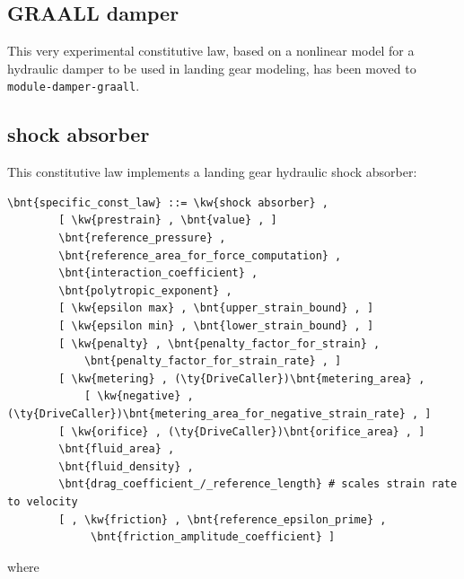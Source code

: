 \subsection{GRAALL damper}
This very experimental constitutive law, based on a nonlinear model
for a hydraulic damper to be used in landing gear modeling,
has been moved to \texttt{module-damper-graall}.

\subsection{shock absorber}\label{sec:CL:SHOCK-ABSORBER}
This constitutive law implements a landing gear hydraulic shock absorber:
\begin{Verbatim}[commandchars=\\\{\}]
    \bnt{specific_const_law} ::= \kw{shock absorber} ,
        [ \kw{prestrain} , \bnt{value} , ]
        \bnt{reference_pressure} ,
        \bnt{reference_area_for_force_computation} ,
        \bnt{interaction_coefficient} ,
        \bnt{polytropic_exponent} ,
        [ \kw{epsilon max} , \bnt{upper_strain_bound} , ]
        [ \kw{epsilon min} , \bnt{lower_strain_bound} , ]
        [ \kw{penalty} , \bnt{penalty_factor_for_strain} , 
            \bnt{penalty_factor_for_strain_rate} , ]
        [ \kw{metering} , (\ty{DriveCaller})\bnt{metering_area} ,
            [ \kw{negative} , (\ty{DriveCaller})\bnt{metering_area_for_negative_strain_rate} , ]
        [ \kw{orifice} , (\ty{DriveCaller})\bnt{orifice_area} , ]
        \bnt{fluid_area} ,
        \bnt{fluid_density} ,
        \bnt{drag_coefficient_/_reference_length} # scales strain rate to velocity
        [ , \kw{friction} , \bnt{reference_epsilon_prime} ,
             \bnt{friction_amplitude_coefficient} ]
\end{Verbatim}
where
